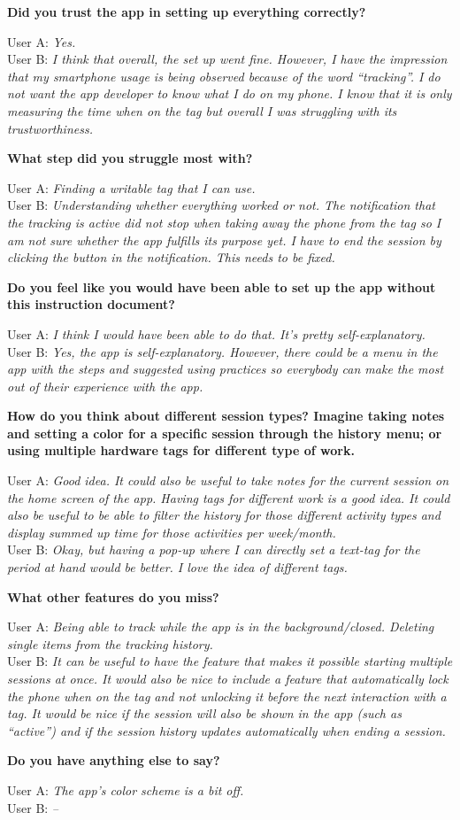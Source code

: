 \documentclass[conference]{IEEEtran}
\newcommand{\surveyquestion}[3]{%
	\noindent\textbf{#1}
	
	\noindent User A: \textit{#2}\\
	User B: \textit{#3}
}
\begin{document}
\surveyquestion{Did you trust the app in setting up everything correctly?}{
	Yes.
}{
	I think that overall, the set up went fine. However, I have the impression that my smartphone usage is being observed because of the word “tracking”. I do not want the app developer to know what I do on my phone. I know that it is only measuring the time when on the tag but overall I was struggling with its trustworthiness.
}

\surveyquestion{What step did you struggle most with?}{
	Finding a writable tag that I can use.
}{
	Understanding whether everything worked or not. The notification that the tracking is active did not stop when taking away the phone from the tag so I am not sure whether the app fulfills its purpose yet. I have to end the session by clicking the button in the notification. This needs to be fixed.
}

\surveyquestion{Do you feel like you would have been able to set up the app without this instruction document?}{
	I think I would have been able to do that. It's pretty self-explanatory.
}{
	Yes, the app is self-explanatory. However, there could be a menu in the app with the steps and suggested using practices so everybody can make the most out of their experience with the app.
}

\surveyquestion{How do you think about different session types? Imagine taking notes and setting a color for a specific session through the history menu; or using multiple hardware tags for different type of work.}{
	Good idea. It could also be useful to take notes for the current session on the home screen of the app. Having tags for different work is a good idea. It could also be useful to be able to filter the history for those different activity types and display summed up time for those activities per week/month.
}{
	Okay, but having a pop-up where I can directly set a text-tag for the period at hand would be better. I love the idea of different tags.
}

\surveyquestion{What other features do you miss?}{
	Being able to track while the app is in the background/closed. Deleting single items from the tracking history.
}{
	It can be useful to have the feature that makes it possible starting multiple sessions at once. It would also be nice to include a feature that automatically lock the phone when on the tag and not unlocking it before the next interaction with a tag. It would be nice if the session will also be shown in the app (such as “active”) and if the session history updates automatically when ending a session.
}

\surveyquestion{Do you have anything else to say?}{
	The app's color scheme is a bit off.
}{
	--
}
\end{document}
